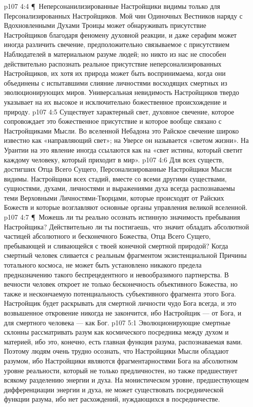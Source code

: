 \vs p107 4:4 \P\ Неперсонанилизированные Настройщики видимы только для Персонализированных Настройщиков. Мой чин Одиночных Вестников наряду с Вдохновленными Духами Троицы может обнаруживать присутствие Настройщиков благодаря феномену духовной реакции, и даже серафим может иногда различить свечение, предположительно связываемое с присутствием Наблюдателей в материальном разуме людей; но никто из нас не способен действительно распознать реальное присутствие неперсонализированных Настройщиков, их хотя их природа может быть воспринимаема, когда они объединены с испытавшими слияние личностями восходящих смертных из эволюционирующих миров. Универсальная невидимость Настройщиков твердо указывает на их высокое и исключительно божественное происхождение и природу.
\vs p107 4:5 Существует характерный свет, духовное свечение, которое сопровождает это божественное присутствие и которое вообще связано с Настройщиками Мысли. Во вселенной Небадона это Райское свечение широко известно как «направляющий свет»; на Уверсе он называется «светом жизни». На Урантии на это явление иногда ссылаются как на «свет истины, который светит каждому человеку, который приходит в мир».
\vs p107 4:6 Для всех существ, достигших Отца Всего Сущего, Персонализированные Настройщики Мысли видимы. Настройщики всех стадий, вместе со всеми другими существами, сущностями, духами, личностями и выражениями духа всегда распознаваемы теми Верховными Личностями\hyp{}Творцами, которые происходят от Райских Божеств и которые возглавляют основные органы управления великой вселенной.
\vs p107 4:7 \P\ Можешь ли ты реально осознать истинную значимость пребывания Настройщика? Действительно ли ты постигаешь, что значит обладать абсолютной частицей абсолютного и бесконечного Божества, Отца Всего Сущего, пребывающей и сливающейся с твоей конечной смертной природой? Когда смертный человек сливается с реальным фрагментом экзистенциальной Причины тотального космоса, не может быть установлено никакого предела предназначению такого беспрецедентного и невообразимого партнерства. В вечности человек откроет не только бесконечность объективного Божества, но также и нескончаемую потенциальность субъективного фрагмента этого Бога. Настройщик будет раскрывать для смертной личности чудо Бога всегда, и это возвышенное откровение никогда не закончится, ибо Настройщик --- от Бога, и для смертного человека --- как Бог.
\vs p107 5:1 Эволюционирующие смертные склонны рассматривать разум как космического посредника между духом и материей, ибо это, конечно, есть главная функция разума, распознаваемая вами. Поэтому людям очень трудно осознать, что Настройщики Мысли обладают разумом, ибо Настройщики являются фрагментарностями Бога на абсолютном уровне реальности, который не только предличностен, но также предшествует всякому разделению энергии и духа. На монистическом уровне, предшествующем дифференциации энергии и духа, не может существовать посреднической функции разума, ибо нет расхождений, нуждающихся в посредничестве.
